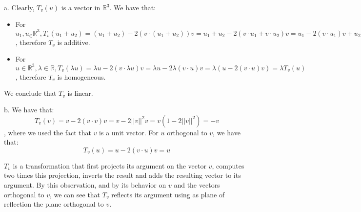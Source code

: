 \begin{solution}

    a. Clearly, $T_v(u)$ is a vector in $\mathbb{R}^3$. We have that:
    \begin{itemize}
        \item For $u_1, u_ \in \mathbb{R}^3, T_v(u_1+u_2) = (u_1+u_2) - 2(v \cdot (u_1+u_2))v = u_1 + u_2 - 2(v \cdot u_1 + v\cdot u_2)v = u_1 - 2(v \cdot u_1)v + u_2 - 2(v \cdot u_2)v = T_v(u_1) + T_v(u_2)$, therefore $T_v$ is additive.
        \item For $u \in \mathbb{R}^3, \lambda \in \mathbb{R}, T_v(\lambda u) = \lambda u -2(v \cdot \lambda u)v = \lambda u - 2 \lambda(v \cdot u)v = \lambda(u - 2(v \cdot u)v) = \lambda T_v(u)$, therefore $T_v$ is homogeneous.
    \end{itemize}
    We conclude that $T_v$ is linear.

    b. We have that:
    $$T_v(v) = v - 2(v \cdot v)v = v - 2\lvert \lvert v \rvert \rvert^2 v = v(1 - 2 \lvert \lvert v \rvert \rvert^2) = -v$$
    , where we used the fact that $v$ is a unit vector.
    For $u$ orthogonal to $v$, we have that:
    $$T_v(u) = u - 2(v \cdot u)v = u$$

    $T_v$ is a transformation that first projects its argument on the vector $v$, computes two times this projection, inverts the result and adds the resulting vector to its argument. By this observation, and by its behavior on $v$ and the vectors orthogonal to $v$, we can see that $T_v$ reflects its argument using as plane of reflection the plane orthogonal to $v$.


\end{solution}
